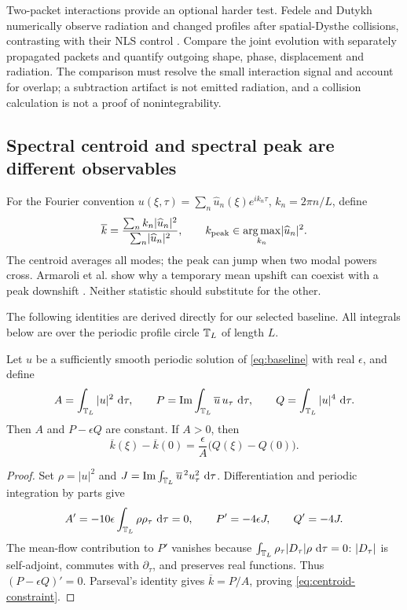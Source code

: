 Two-packet interactions provide an optional harder test. Fedele and Dutykh
numerically observe radiation and changed profiles after spatial-Dysthe
collisions, contrasting with their NLS control \cite{fedele}. Compare the
joint evolution with separately propagated packets and quantify outgoing
shape, phase, displacement and radiation. The comparison must resolve the
small interaction signal and account for overlap; a subtraction artifact
is not emitted radiation, and a collision calculation is not a proof of
nonintegrability.

\subsection{Spectral centroid and spectral peak are different observables}

For the Fourier convention
$u(\xi,\tau)=\sum_n\widehat u_n(\xi)e^{ik_n\tau}$,
$k_n=2\pi n/L$, define
\[
 \overline k=\frac{\sum_n k_n\lvert \widehat u_n\rvert^2}
                     {\sum_n\lvert \widehat u_n\rvert^2},
 \qquad
 k_{\mathrm{peak}}\in\operatorname*{arg\,max}_{k_n}
                         \lvert \widehat u_n\rvert^2.
\]
The centroid averages all modes; the peak can jump when two modal powers
cross. Armaroli et al. show why a temporary mean upshift can coexist with
a peak downshift \cite{recurrence}. Neither statistic should substitute for
the other.

The following identities are derived directly for our selected baseline.
All integrals below are over the periodic profile circle $\mathbb T_L$ of length $L$.

\begin{proposition}
\label{prop:centroid}
Let $u$ be a sufficiently smooth periodic solution of \eqref{eq:baseline}
with real $\epsilon$, and define
\[
 A=\int_{\mathbb T_L}|u|^2\,\,\mathrm d\tau,\qquad
 P=\operatorname{Im}\int_{\mathbb T_L}\overline u\,u_\tau\,\,\mathrm d\tau,\qquad
 Q=\int_{\mathbb T_L}|u|^4\,\,\mathrm d\tau.
\]
Then $A$ and $P-\epsilon Q$ are constant. If $A>0$, then
\begin{equation}
 \overline k(\xi)-\overline k(0)
 =\frac{\epsilon}{A}\bigl(Q(\xi)-Q(0)\bigr).
 \label{eq:centroid-constraint}
\end{equation}
\end{proposition}
\begin{proof}
Set $\rho=|u|^2$ and
$J=\operatorname{Im}\int_{\mathbb T_L}\overline u^{\,2}u_\tau^2\,\,\mathrm d\tau$.
Differentiation and periodic integration by parts give
\[
 A'=-10\epsilon\int_{\mathbb T_L}\rho\rho_\tau\,\,\mathrm d\tau=0,
 \qquad P'=-4\epsilon J,\qquad Q'=-4J.
\]
The mean-flow contribution to $P'$ vanishes because
$\int_{\mathbb T_L}\rho_\tau\lvert D_\tau\rvert\rho\,\,\mathrm d\tau=0$: $\lvert D_\tau\rvert$ is self-adjoint,
commutes with $\partial_\tau$, and preserves real functions.
Thus $(P-\epsilon Q)'=0$. Parseval's identity gives
$\overline k=P/A$, proving \eqref{eq:centroid-constraint}.
\end{proof}

